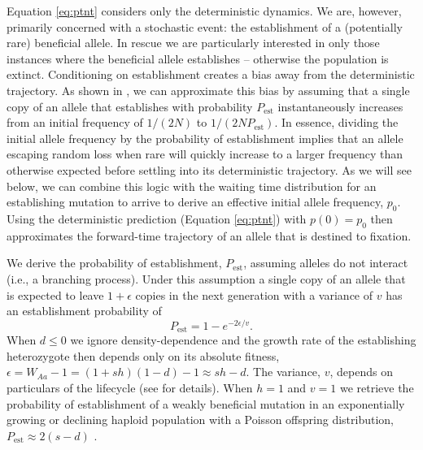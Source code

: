\documentclass[]{article}
\begin{document}
Equation \ref{eq:ptnt} considers only the deterministic dynamics. 
We are, however, primarily concerned with a stochastic event: the establishment of a (potentially rare) beneficial allele.
In rescue we are particularly interested in only those instances where the beneficial allele establishes -- otherwise the population is extinct.
Conditioning on establishment creates a bias away from the deterministic trajectory.
As shown in \cite{smith1971use} \citep[see][for an application to evolutionary rescue]{orr2014population}, we can approximate this bias by assuming that a single copy of an allele that establishes with probability $P_\mathrm{est}$ instantaneously increases from an initial frequency of $1/(2N)$ to $1/(2NP_\mathrm{est})$.
In essence, dividing the initial allele frequency by the probability of establishment implies that an allele escaping random loss when rare will quickly increase to a larger frequency than otherwise expected before settling into its deterministic trajectory.
As we will see below, we can combine this logic with the waiting time distribution for an establishing mutation to arrive to derive an effective initial allele frequency, $p_0$.
Using the deterministic prediction (Equation \ref{eq:ptnt}) with $p(0) = p_0$ then approximates the forward-time trajectory of an allele that is destined to fixation.

We derive the probability of establishment, $P_\mathrm{est}$, assuming alleles do not interact (i.e., a branching process).
Under this assumption a single copy of an allele that is expected to leave $1+\epsilon$ copies in the next generation with a variance of $v$ has an establishment probability of \citep[][p.\ 172, see also \citealp{feller1951diffusion}, equation 5.7, for a derivation from a diffusion approximation]{allen2010introduction}
\begin{equation}\label{eq:pest}
P_\mathrm{est} = 1 - e^{-2 \epsilon/v}.
\end{equation}
When $d\leq0$ we ignore density-dependence and the growth rate of the establishing heterozygote then depends only on its absolute fitness, $\epsilon = W_{Aa} - 1 = (1 + s h)(1-d)-1 \approx s h - d$.
The variance, $v$, depends on particulars of the lifecycle (see  for details).
When $h=1$ and $v=1$ we retrieve the probability of establishment of a weakly beneficial mutation in an exponentially growing or declining haploid population with a Poisson offspring distribution, $P_\mathrm{est} \approx 2(s - d)$ \citep{otto1997probability}.
\end{document}
